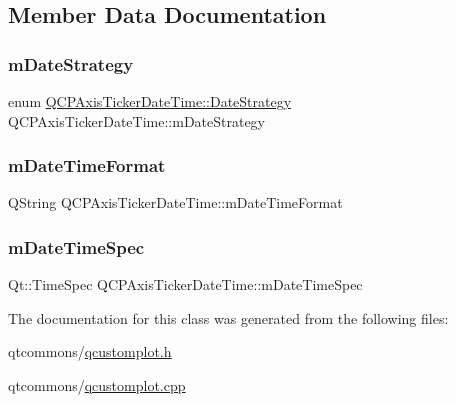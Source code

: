 \subsection{Member Data Documentation}
\mbox{\label{class_q_c_p_axis_ticker_date_time_a93fca912446ca341bee277cb2cc84e49}} 
\subsubsection{\texorpdfstring{mDateStrategy}{mDateStrategy}}
{\footnotesize\ttfamily enum \mbox{\hyperlink{class_q_c_p_axis_ticker_date_time_af2c7c60821a6234ca7a172f42ef7f1d8}{Q\+C\+P\+Axis\+Ticker\+Date\+Time\+::\+Date\+Strategy}}  Q\+C\+P\+Axis\+Ticker\+Date\+Time\+::m\+Date\+Strategy\hspace{0.3cm}{\ttfamily [protected]}}

\mbox{\label{class_q_c_p_axis_ticker_date_time_adbbb25add598377998c0c57dbd29adaf}} 
\subsubsection{\texorpdfstring{mDateTimeFormat}{mDateTimeFormat}}
{\footnotesize\ttfamily Q\+String Q\+C\+P\+Axis\+Ticker\+Date\+Time\+::m\+Date\+Time\+Format\hspace{0.3cm}{\ttfamily [protected]}}

\mbox{\label{class_q_c_p_axis_ticker_date_time_a5f5abe83c371f13eb3415585e638dba9}} 
\subsubsection{\texorpdfstring{mDateTimeSpec}{mDateTimeSpec}}
{\footnotesize\ttfamily Qt\+::\+Time\+Spec Q\+C\+P\+Axis\+Ticker\+Date\+Time\+::m\+Date\+Time\+Spec\hspace{0.3cm}{\ttfamily [protected]}}



The documentation for this class was generated from the following files\+:\begin{DoxyCompactItemize}
\item 
qtcommons/\mbox{\hyperlink{qcustomplot_8h}{qcustomplot.\+h}}\item 
qtcommons/\mbox{\hyperlink{qcustomplot_8cpp}{qcustomplot.\+cpp}}\end{DoxyCompactItemize}
